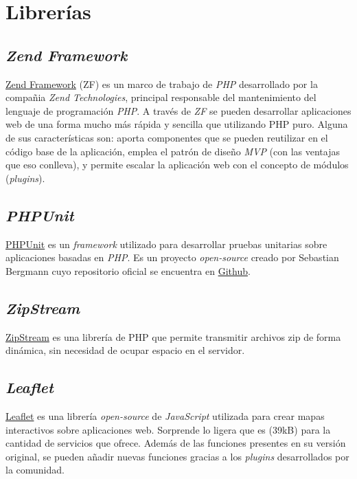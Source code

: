 \section{Librerías}

\subsection{\emph{Zend Framework}}

\href{https://framework.zend.com/}{Zend Framework} (ZF) es un
marco de trabajo de \emph{PHP} desarrollado por la compañia \emph{Zend
Technologies}, principal responsable del mantenimiento del lenguaje de
programación \emph{PHP}. A través de \emph{ZF} se pueden desarrollar aplicaciones web
de una forma mucho más rápida y sencilla que utilizando PHP puro. Alguna
de sus características son: aporta componentes que se pueden
reutilizar en el código base de la aplicación, emplea el patrón de
diseño \emph{MVP} (con las ventajas que eso conlleva), y permite escalar la
aplicación web con el concepto de módulos (\emph{plugins}).

\subsection{\emph{PHPUnit}}

\href{https://phpunit.de/}{PHPUnit} es un \emph{framework} utilizado
para desarrollar pruebas unitarias sobre aplicaciones basadas en \emph{PHP}. Es
un proyecto \emph{open-source} creado por Sebastian Bergmann cuyo
repositorio oficial se encuentra en
\href{https://github.com/sebastianbergmann/phpunit}{Github}.

\subsection{\emph{ZipStream}}

\href{https://github.com/maennchen/ZipStream-PHP/tree/0.2.2}{ZipStream}
es una librería de PHP que permite transmitir archivos zip de forma
dinámica, sin necesidad de ocupar espacio en el servidor.

\subsection{\emph{Leaflet}}

\href{https://github.com/Leaflet/Leaflet}{Leaflet} es una librería
\emph{open-source} de \emph{JavaScript} utilizada para crear mapas
interactivos sobre aplicaciones web. Sorprende lo ligera que es (39kB)
para la cantidad de servicios que ofrece. Además de las funciones
presentes en su versión original, se pueden añadir nuevas funciones
gracias a los \emph{plugins} desarrollados por la comunidad.

